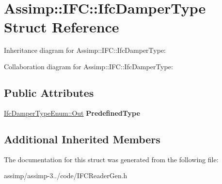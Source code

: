 \hypertarget{struct_assimp_1_1_i_f_c_1_1_ifc_damper_type}{\section{Assimp\+:\+:I\+F\+C\+:\+:Ifc\+Damper\+Type Struct Reference}
\label{struct_assimp_1_1_i_f_c_1_1_ifc_damper_type}
}


Inheritance diagram for Assimp\+:\+:I\+F\+C\+:\+:Ifc\+Damper\+Type\+:


Collaboration diagram for Assimp\+:\+:I\+F\+C\+:\+:Ifc\+Damper\+Type\+:
\subsection*{Public Attributes}
\begin{DoxyCompactItemize}
\item 
\hypertarget{struct_assimp_1_1_i_f_c_1_1_ifc_damper_type_a5254ad1228f9b07bba461534c062431a}{\hyperlink{classboost_1_1shared__ptr}{Ifc\+Damper\+Type\+Enum\+::\+Out} {\bfseries Predefined\+Type}}\label{struct_assimp_1_1_i_f_c_1_1_ifc_damper_type_a5254ad1228f9b07bba461534c062431a}

\end{DoxyCompactItemize}
\subsection*{Additional Inherited Members}


The documentation for this struct was generated from the following file\+:\begin{DoxyCompactItemize}
\item 
assimp/assimp-\/3../code/I\+F\+C\+Reader\+Gen.\+h\end{DoxyCompactItemize}

